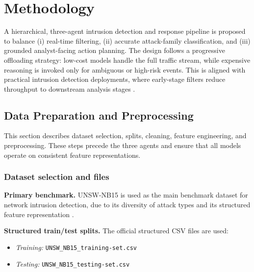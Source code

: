 \documentclass[conference]{IEEEtran}
\begin{document}

\section{Methodology}
\label{sec:methodology}

A hierarchical, three-agent intrusion detection and response pipeline is proposed to balance (i) real-time filtering, (ii) accurate attack-family classification, and (iii) grounded analyst-facing action planning. The design follows a progressive offloading strategy: low-cost models handle the full traffic stream, while expensive reasoning is invoked only for ambiguous or high-risk events. This is aligned with practical intrusion detection deployments, where early-stage filters reduce throughput to downstream analysis stages \cite{Mirsky2018Kitsune}.

\subsection{Data Preparation and Preprocessing}
\label{sec:data_preparation}

This section describes dataset selection, splits, cleaning, feature engineering, and preprocessing. These steps precede the three agents and ensure that all models operate on consistent feature representations.

\subsubsection{Dataset selection and files}
\textbf{Primary benchmark.} UNSW-NB15 is used as the main benchmark dataset for network intrusion detection, due to its diversity of attack types and its structured feature representation \cite{Moustafa2015UNSW,Moustafa2015UNSW2}.

\textbf{Structured train/test splits.} The official structured CSV files are used:
\begin{itemize}
  \item \emph{Training:} \texttt{UNSW\_NB15\_training-set.csv}
  \item \emph{Testing:} \texttt{UNSW\_NB15\_testing-set.csv}
\end{itemize}
\end{document}
